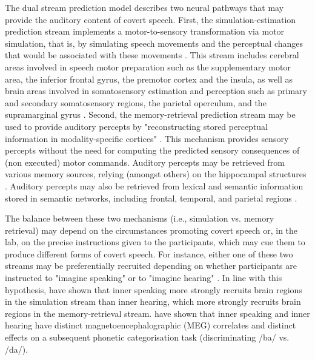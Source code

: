 \documentclass[utf8]{template/frontiersSCNS} %
\begin{document}

The dual stream prediction model \citep{tian_mental_2012, tian_effect_2013, tian_mental_2016} describes two neural pathways that may provide the auditory content of covert speech. First, the simulation-estimation prediction stream implements a motor-to-sensory transformation via motor simulation, that is, by simulating speech movements and the perceptual changes that would be associated with these movements \citep[see also][for a similar proposal]{loevenbruck_cognitive_2018}. This stream includes cerebral areas involved in speech motor preparation such as the supplementary motor area, the inferior frontal gyrus, the premotor cortex and the insula, as well as brain areas involved in somatosensory estimation and perception such as primary and secondary somatosensory regions, the parietal operculum, and the supramarginal gyrus \citep{tian_mental_2016}. Second, the memory-retrieval prediction stream may be used to provide auditory percepts by "reconstructing stored perceptual information in modality-specific cortices" \citep{tian_mental_2016}. This mechanism provides sensory percepts without the need for computing the predicted sensory consequences of (non executed) motor commands. Auditory percepts may be retrieved from various memory sources, relying (amongst others) on the hippocampal structures \citep{tian_mental_2016}. Auditory percepts may also be retrieved from lexical and semantic information stored in semantic networks, including frontal, temporal, and parietal regions \citep[for more details, see][]{tian_mental_2016}.



The balance between these two mechanisms (i.e., simulation vs. memory retrieval) may depend on the circumstances promoting covert speech or, in the lab, on the precise instructions given to the participants, which may cue them to produce different forms of covert speech. For instance, either one of these two streams may be preferentially recruited depending on whether participants are instructed to "imagine speaking" or to "imagine hearing" \citep[see also the distinction between the "inner ear" and the "inner voice", e.g.,][]{smith_subvocalization_1992}. In line with this hypothesis, \cite{tian_mental_2016} have shown that inner speaking more strongly recruits brain regions in the simulation stream than inner hearing, which more strongly recruits brain regions in the memory-retrieval stream. \cite{ma_distinct_2019} have shown that inner speaking and inner hearing have distinct magnetoencephalographic (MEG) correlates and distinct effects on a subsequent phonetic categorisation task (discriminating /ba/ vs. /da/).
\end{document}
